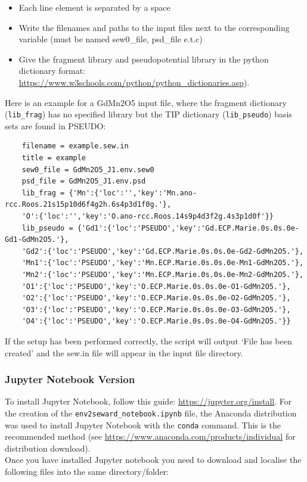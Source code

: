 \begin{itemize}
	\item Each line element is separated by a space
	\item Write the filenames and paths to the input files next to the corresponding variable (must be named sew0\_file, psd\_file e.t.c)
	\item Give the fragment library and pseudopotential library in the python dictionary format: \url{https://www.w3schools.com/python/python_dictionaries.asp}).
\end{itemize}

Here is an example for a GdMn2O5 input file, where the fragment dictionary (\texttt{lib\_frag}) has no specified library but the TIP dictionary (\texttt{lib\_pseudo}) basis sets are found in PSEUDO:

\begin{lstlisting}
	filename = example.sew.in
	title = example
	sew0_file = GdMn2O5_J1.env.sew0
	psd_file = GdMn2O5_J1.env.psd
	lib_frag = {'Mn':{'loc':'','key':'Mn.ano-rcc.Roos.21s15p10d6f4g2h.6s4p3d1f0g.'},
	'O':{'loc':'','key':'O.ano-rcc.Roos.14s9p4d3f2g.4s3p1d0f'}}
	lib_pseudo = {'Gd1':{'loc':'PSEUDO','key':'Gd.ECP.Marie.0s.0s.0e-Gd1-GdMn2O5.'},
	'Gd2':{'loc':'PSEUDO','key':'Gd.ECP.Marie.0s.0s.0e-Gd2-GdMn2O5.'},
	'Mn1':{'loc':'PSEUDO','key':'Mn.ECP.Marie.0s.0s.0e-Mn1-GdMn2O5.'},
	'Mn2':{'loc':'PSEUDO','key':'Mn.ECP.Marie.0s.0s.0e-Mn2-GdMn2O5.'},
	'O1':{'loc':'PSEUDO','key':'O.ECP.Marie.0s.0s.0e-O1-GdMn2O5.'},
	'O2':{'loc':'PSEUDO','key':'O.ECP.Marie.0s.0s.0e-O2-GdMn2O5.'},
	'O3':{'loc':'PSEUDO','key':'O.ECP.Marie.0s.0s.0e-O3-GdMn2O5.'},
	'O4':{'loc':'PSEUDO','key':'O.ECP.Marie.0s.0s.0e-O4-GdMn2O5.'}}
\end{lstlisting}

If the setup has been performed correctly, the script will output `File has been created' and the sew.in file will appear in the input file directory.

\subsubsection{Jupyter Notebook Version}
To install Jupyter Notebook, follow this guide: \url{https://jupyter.org/install}. For the creation of the \texttt{env2seward\_notebook.ipynb} file, the Anaconda distribution was used to install Jupyter Notebook with the \texttt{conda} command. This is the recommended method (see \url{https://www.anaconda.com/products/individual} for distribution download). 
\\
Once you have installed Jupyter notebook you need to download and localise the following files into the same directory/folder:

